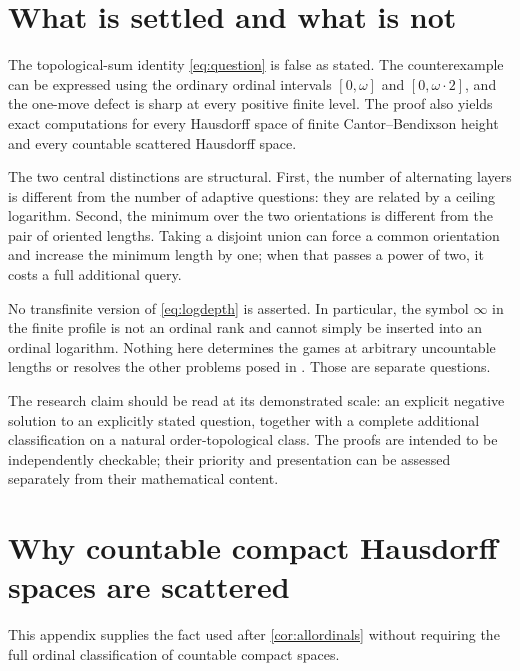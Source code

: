 \documentclass[11pt,letterpaper]{article}
\numberwithin{equation}{section}
\theoremstyle{definition}
\theoremstyle{remark}
\begin{document}
\section{What is settled and what is not}

The topological-sum identity \eqref{eq:question} is false as stated. The
counterexample can be expressed using the ordinary ordinal intervals
$[0,\omega]$ and $[0,\omega\cdot2]$, and the one-move defect is sharp at every
positive finite level. The proof also yields exact computations for every
Hausdorff space of finite Cantor--Bendixson height and every countable scattered
Hausdorff space.

The two central distinctions are structural. First, the number of alternating
layers is different from the number of adaptive questions: they are related
by a ceiling logarithm. Second, the minimum over the two orientations is
different from the pair of oriented lengths. Taking a disjoint union can force
a common orientation and increase the minimum length by one; when that passes
a power of two, it costs a full additional query.

No transfinite version of \eqref{eq:logdepth} is asserted. In particular, the
symbol $\infty$ in the finite profile is not an ordinal rank and cannot simply
be inserted into an ordinal logarithm. Nothing here determines the games at
arbitrary uncountable lengths or resolves the other problems posed in
\cite{CCS}. Those are separate questions.

The research claim should be read at its demonstrated scale: an explicit
negative solution to an explicitly stated question, together with a complete additional
classification on a natural order-topological class. The proofs are intended
to be independently checkable; their priority and presentation can be assessed
separately from their mathematical content.

\appendix
\section{Why countable compact Hausdorff spaces are scattered}\label{app:compact}

This appendix supplies the fact used after \cref{cor:allordinals} without
requiring the full ordinal classification of countable compact spaces.
\end{document}

